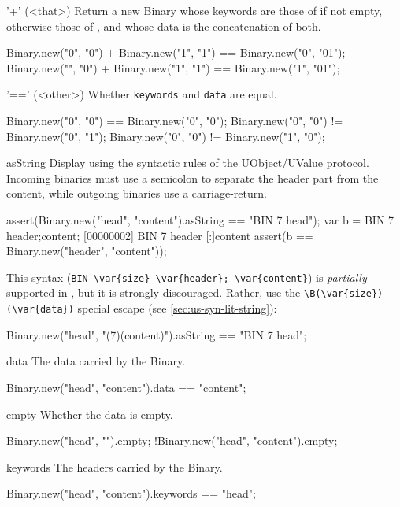 \begin{urbiscriptapi}
\item['+'](<that>)%
  Return a new Binary whose keywords are those of \this if
  not empty, otherwise those of , and whose data is the
  concatenation of both.
\begin{urbiassert}
Binary.new("0", "0") + Binary.new("1", "1")
       == Binary.new("0", "01");
Binary.new("", "0") + Binary.new("1", "1")
       == Binary.new("1", "01");
\end{urbiassert}

\item['=='](<other>)%
  Whether \lstinline|keywords| and \lstinline|data| are equal.
\begin{urbiassert}
Binary.new("0", "0") == Binary.new("0", "0");
Binary.new("0", "0") != Binary.new("0", "1");
Binary.new("0", "0") != Binary.new("1", "0");
\end{urbiassert}

\item[asString]
  Display using the syntactic rules of the UObject/UValue protocol.
  Incoming binaries must use a semicolon to separate the header part
  from the content, while outgoing binaries use a carriage-return.
\begin{urbiscript}
assert(Binary.new("head", "content").asString
       == "BIN 7 head\ncontent");
var b = BIN 7 header;content;
[00000002] BIN 7 header
[:]content
assert(b == Binary.new("header", "content"));
\end{urbiscript}

This syntax (\lstinline|BIN \var{size} \var{header}; \var{content}|)
is \emph{partially} supported in \us, but it is strongly discouraged.
Rather, use the \lstinline|\B(\var{size})(\var{data})| special escape
(see \autoref{sec:us-syn-lit-string}):

\begin{urbiassert}
Binary.new("head", "\B(7)(content)").asString
       == "BIN 7 head\ncontent";
\end{urbiassert}


\item[data]
  The data carried by the Binary.
\begin{urbiassert}
Binary.new("head", "content").data == "content";
\end{urbiassert}

\item[empty]
  Whether the data is empty.
\begin{urbiassert}
Binary.new("head", "").empty;
!Binary.new("head", "content").empty;
\end{urbiassert}

\item[keywords]
  The headers carried by the Binary.
\begin{urbiassert}
Binary.new("head", "content").keywords == "head";
\end{urbiassert}
\end{urbiscriptapi}



